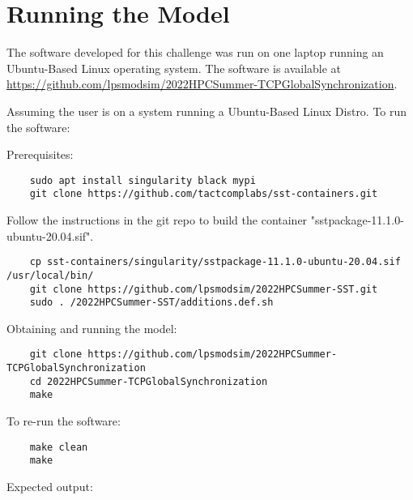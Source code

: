\documentclass{article}
\begin{document}
\section{Running the Model}

The software developed for this challenge was run on one laptop running an Ubuntu-Based Linux operating system.
The software is available at \href{https://github.com/lpsmodsim/2022HPCSummer-TCPGlobalSynchronization}{https://github.com/lpsmodsim/2022HPCSummer-TCPGlobalSynchronization}.\newline

\noindent Assuming the user is on a system running a Ubuntu-Based Linux Distro. To run the software:\newline

\noindent Prerequisites: 

\begin{verbatim}
	sudo apt install singularity black mypi
	git clone https://github.com/tactcomplabs/sst-containers.git
\end{verbatim}

\noindent Follow the instructions in the git repo to build the container "sstpackage-11.1.0-ubuntu-20.04.sif".

\begin{verbatim}
	cp sst-containers/singularity/sstpackage-11.1.0-ubuntu-20.04.sif /usr/local/bin/
	git clone https://github.com/lpsmodsim/2022HPCSummer-SST.git
	sudo . /2022HPCSummer-SST/additions.def.sh
\end{verbatim}

\noindent Obtaining and running the model:

\begin{verbatim}
	git clone https://github.com/lpsmodsim/2022HPCSummer-TCPGlobalSynchronization
	cd 2022HPCSummer-TCPGlobalSynchronization
	make
\end{verbatim}

\noindent To re-run the software:

\begin{verbatim}
	make clean
	make
\end{verbatim}

\noindent Expected output:
\end{document}
